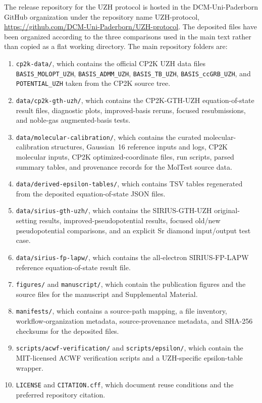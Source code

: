\documentclass[aps,prb,preprint,amsmath,amssymb,superscriptaddress,longbibliography,floatfix]{revtex4-2}
\begin{document}
The release repository for the UZH protocol is hosted in the DCM-Uni-Paderborn GitHub organization under the repository name UZH-protocol, \url{https://github.com/DCM-Uni-Paderborn/UZH-protocol}. The deposited files have been organized according to the three comparisons used in the main text rather than copied as a flat working directory. The main repository folders are:
\begin{enumerate}
\item \texttt{cp2k-data/}, which contains the official CP2K UZH data files \texttt{BASIS\_MOLOPT\_UZH}, \texttt{BASIS\_ADMM\_UZH}, \texttt{BASIS\_TB\_UZH}, \texttt{BASIS\_ccGRB\_UZH}, and \texttt{POTENTIAL\_UZH} taken from the CP2K source tree.
\item \texttt{data/cp2k-gth-uzh/}, which contains the CP2K-GTH-UZH equation-of-state result files, diagnostic plots, improved-basis reruns, focused resubmissions, and noble-gas augmented-basis tests.
\item \texttt{data/molecular-calibration/}, which contains the curated molecular-calibration structures, Gaussian~16 reference inputs and logs, CP2K molecular inputs, CP2K optimized-coordinate files, run scripts, parsed summary tables, and provenance records for the MolTest source data.
\item \texttt{data/derived-epsilon-tables/}, which contains TSV tables regenerated from the deposited equation-of-state JSON files.
\item \texttt{data/sirius-gth-uzh/}, which contains the SIRIUS-GTH-UZH original-setting results, improved-pseudopotential results, focused old/new pseudopotential comparisons, and an explicit Sr diamond input/output test case.
\item \texttt{data/sirius-fp-lapw/}, which contains the all-electron SIRIUS-FP-LAPW reference equation-of-state result file.
\item \texttt{figures/} and \texttt{manuscript/}, which contain the publication figures and the source files for the manuscript and Supplemental Material.
\item \texttt{manifests/}, which contains a source-path mapping, a file inventory, workflow-organization metadata, source-provenance metadata, and SHA-256 checksums for the deposited files.
\item \texttt{scripts/acwf-verification/} and \texttt{scripts/epsilon/}, which contain the MIT-licensed ACWF verification scripts and a UZH-specific epsilon-table wrapper.
\item \texttt{LICENSE} and \texttt{CITATION.cff}, which document reuse conditions and the preferred repository citation.
\end{enumerate}
\end{document}
